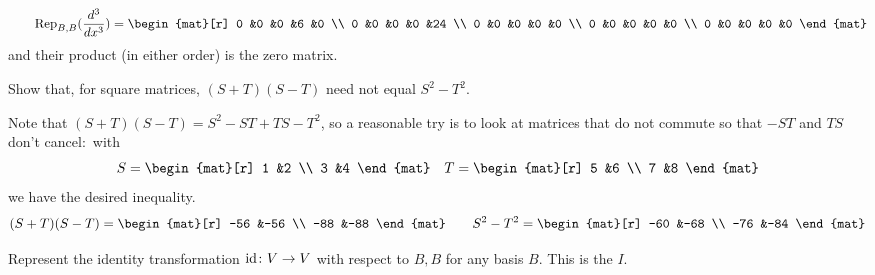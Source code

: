 \begin{exercises}
\begin{answer}
\begin{exparts}
\begin{equation*}
            \qquad
            \rep{\frac{d^3}{dx^3}}{B,B}=\begin{mat}[r]
              0  &0  &0  &6  &0  \\
              0  &0  &0  &0  &24 \\
              0  &0  &0  &0  &0  \\
              0  &0  &0  &0  &0  \\
              0  &0  &0  &0  &0
            \end{mat}
          \end{equation*}
          and their product (in either order) is the zero matrix.
      \end{exparts}  
    \end{answer}
  \item 
    Show that, for square matrices, \( (S+T)(S-T) \) need not equal
    \( S^2-T^2 \).
    \begin{answer}
      Note that \( (S+T)(S-T)=S^2-ST+TS-T^2 \), so a reasonable try is to look
      at matrices that do not commute so that $-ST$ and $TS$ don't 
      cancel:~with 
      \begin{equation*}
        S=\begin{mat}[r]
            1  &2  \\
            3  &4
          \end{mat}
        \quad
        T=\begin{mat}[r]
            5  &6  \\
            7  &8
          \end{mat}
      \end{equation*}
      we have the desired inequality.
      \begin{equation*}
        (S+T)(S-T)=\begin{mat}[r]
            -56  &-56  \\
            -88  &-88
          \end{mat}
        \qquad
        S^2-T^2=\begin{mat}[r]
            -60  &-68  \\
            -76  &-84
          \end{mat}
      \end{equation*}    
    \end{answer}
  \recommended \item \label{exer:IdMat} 
    Represent the identity transformation 
    $\mbox{$\mbox{id}\colon V\to V$}$ with respect to $B,B$ for any
    basis $B$.
    This is the  $I$.

\end{exercises}
